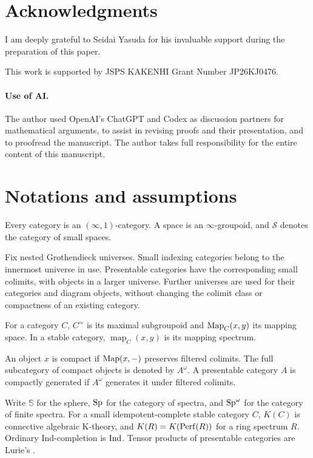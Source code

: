 \section*{Acknowledgments}
I am deeply grateful to Seidai Yasuda for his invaluable support during the preparation of this paper.

This work is supported by JSPS KAKENHI Grant Number JP26KJ0476.



\paragraph{Use of AI.}
The author used OpenAI's ChatGPT and Codex as
discussion partners for mathematical arguments,
to assist in revising proofs and their presentation,
and to proofread the manuscript.
The author takes full responsibility for the entire content of this manuscript.


\section*{Notations and assumptions}
\label{sec:notations}

Every category is an $(\infty,1)$-category. A space is an
$\infty$-groupoid, and $\mathcal S$ denotes the category of small spaces.

Fix nested Grothendieck universes. Small indexing categories belong to
the innermost universe in use. Presentable categories have the
corresponding small colimits, with objects in a larger universe.
Further universes are used for their categories and diagram objects,
without changing the colimit class or compactness of an existing
category.


For a category $C$, $C^\simeq$ is its maximal subgroupoid and
$\operatorname{Map}_C(x,y)$ its mapping space. In a stable category,
$\operatorname{map}_C(x,y)$ is its mapping spectrum.


An object $x$ is compact if $\operatorname{Map}(x,-)$ preserves filtered colimits.
The full subcategory of compact objects is denoted by $A^\omega$.
A presentable category $A$ is compactly generated if $A^\omega$
generates it under filtered colimits.

Write $\mathbb S$ for the sphere, $\mathrm{Sp}$ for the category of spectra, and
$\mathrm{Sp}^\omega$ for the category of finite spectra. For a small idempotent-complete
stable category $C$, $K(C)$ is connective algebraic K-theory, and
$K(R)=K(\operatorname{Perf}(R))$ for a ring spectrum $R$.
Ordinary Ind-completion is $\operatorname{Ind}$. Tensor products of presentable categories are
Lurie's \citep[Section~4.8.1]{LurieHA}.

